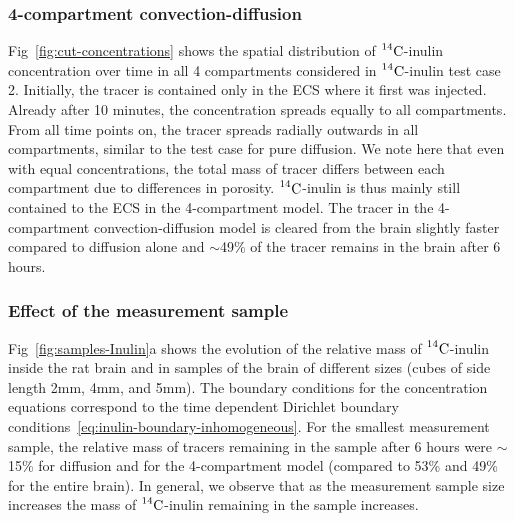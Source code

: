 \documentclass[10pt]{article}
\newcommand{\ie}{\emph{i.e.}\;}
\newcommand{\1}{^{(1)}}
\newcommand{\2}{^{(2)}}
\newcommand{\Cinulin}{$\prescript{14}{}{\text{C}}$-inulin }
\begin{document}
\subsubsection{4-compartment convection-diffusion}
\label{subsec:baseline2}

Fig~\ref{fig:cut-concentrations} shows the spatial distribution of \Cinulin concentration over time in all 4 compartments considered in \Cinulin test case 2. Initially, the tracer is contained only in the ECS where it first was injected. Already after 10 minutes, the concentration spreads equally to all compartments. From all time points on, the tracer spreads radially outwards in all compartments, similar to the test case for pure diffusion. We note here that even with equal concentrations, the total mass of tracer differs between each compartment due to differences in porosity. \Cinulin is thus mainly still contained to the ECS in the 4-compartment model. The tracer in the 4-compartment convection-diffusion model is cleared from the brain slightly faster compared to diffusion alone and $\sim$49\% of the tracer remains in the brain after 6 hours. 





\subsubsection{Effect of the measurement sample} 
Fig~\ref{fig:samples-Inulin}a shows the evolution of the relative mass of \Cinulin inside the rat brain and in samples of the brain of different sizes (cubes of side length 2\si{mm}, 4\si{mm}, and 5\si{mm}). The boundary conditions for the concentration equations correspond to the time dependent Dirichlet boundary conditions~\eqref{eq:inulin-boundary-inhomogeneous}. For the smallest measurement sample, the relative mass of tracers remaining in the sample after 6 hours were $\sim$15\% for diffusion and for the 4-compartment model (compared to 53\% and 49\% for the entire brain). In general, we observe that as the measurement sample size increases the mass of \Cinulin remaining in the sample increases.
\end{document}

